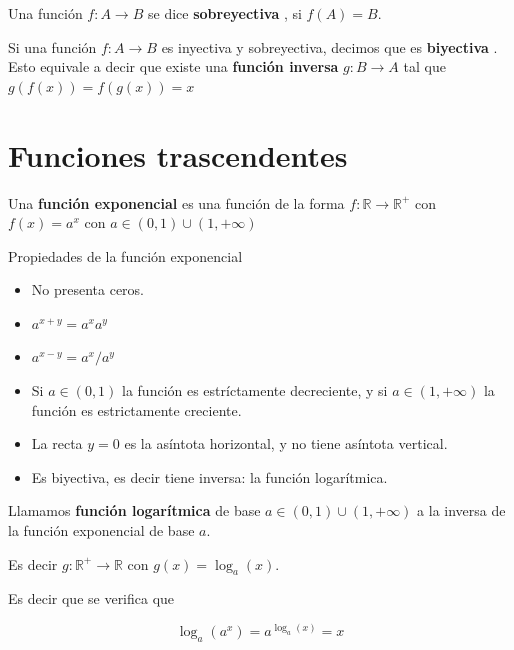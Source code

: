 Una función $f : A \to B$ se dice \textbf{sobreyectiva} , si $f(A) = B$.

Si una función $f : A \to B$ es inyectiva y sobreyectiva, decimos que es \textbf{biyectiva} .  Esto equivale a decir que existe una \textbf{función inversa}  $g : B \to A$ tal que $g(f(x)) = f(g(x)) = x$

\section{Funciones trascendentes}

\begin{definition} 
Una \textbf{función exponencial} es una función de la forma $f : \mathbb{R} \to \mathbb{R}^+$ con $f(x) = a^x$ con $a \in (0,1) \cup (1, +\infty)$

\end{definition}

\begin{property}
Propiedades de la función exponencial

\begin{itemize}

\item No presenta ceros.

\item $ a^{x+y} = a^x a^y$ 

\item $a^{x-y} = a^x / a^y$

\item Si $a \in (0,1)$ la función es estríctamente decreciente, y si $a \in (1, +\infty)$  la función es estrictamente creciente.

\item La recta $y=0$ es la asíntota horizontal, y no tiene asíntota vertical.

\item Es biyectiva, es decir tiene inversa: la función logarítmica.

\end{itemize}
\end{property}

\begin{definition} 

Llamamos \textbf{función logarítmica} de base $a \in (0,1) \cup (1, +\infty)$ a la inversa de la función exponencial de base $a$.  

Es decir $g : \mathbb{R}^+ \to \mathbb{R}$ con $g(x) = \log_a(x)$.

Es decir que se verifica que

$$ \log_a(a^x) = a^{\log_a(x)} = x $$
	
\end{definition}

